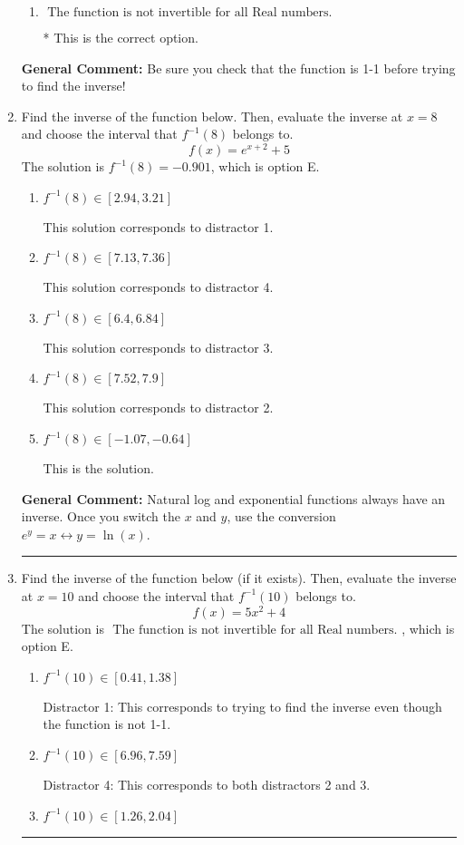 \documentclass{extbook}[14pt]
\newcommand{\litem}[1]{\item #1

\rule{\textwidth}{0.4pt}}
\begin{document}
\begin{enumerate}
{\begin{enumerate}[label=\Alph*.]
 Distractor 2: This corresponds to finding the (nonexistent) inverse and not subtracting by the vertical shift.
\item \( \text{ The function is not invertible for all Real numbers. } \)

* This is the correct option.
\end{enumerate}

\textbf{General Comment:} Be sure you check that the function is 1-1 before trying to find the inverse!
}
\litem{
Find the inverse of the function below. Then, evaluate the inverse at $x = 8$ and choose the interval that $f^{-1}(8)$ belongs to.
\[ f(x) = e^{x+2}+5 \]
The solution is \( f^{-1}(8) = -0.901 \), which is option E.\begin{enumerate}[label=\Alph*.]
\item \( f^{-1}(8) \in [2.94, 3.21] \)

 This solution corresponds to distractor 1.
\item \( f^{-1}(8) \in [7.13, 7.36] \)

 This solution corresponds to distractor 4.
\item \( f^{-1}(8) \in [6.4, 6.84] \)

 This solution corresponds to distractor 3.
\item \( f^{-1}(8) \in [7.52, 7.9] \)

 This solution corresponds to distractor 2.
\item \( f^{-1}(8) \in [-1.07, -0.64] \)

 This is the solution.
\end{enumerate}

\textbf{General Comment:} Natural log and exponential functions always have an inverse. Once you switch the $x$ and $y$, use the conversion $ e^y = x \leftrightarrow y=\ln(x)$.
}
\litem{
Find the inverse of the function below (if it exists). Then, evaluate the inverse at $x = 10$ and choose the interval that $f^{-1}(10)$ belongs to.
\[ f(x) = 5 x^2 + 4 \]
The solution is \( \text{ The function is not invertible for all Real numbers. } \), which is option E.\begin{enumerate}[label=\Alph*.]
\item \( f^{-1}(10) \in [0.41, 1.38] \)

 Distractor 1: This corresponds to trying to find the inverse even though the function is not 1-1. 
\item \( f^{-1}(10) \in [6.96, 7.59] \)

 Distractor 4: This corresponds to both distractors 2 and 3.
\item \( f^{-1}(10) \in [1.26, 2.04] \)


\end{enumerate}}
\end{enumerate}
\end{document}
